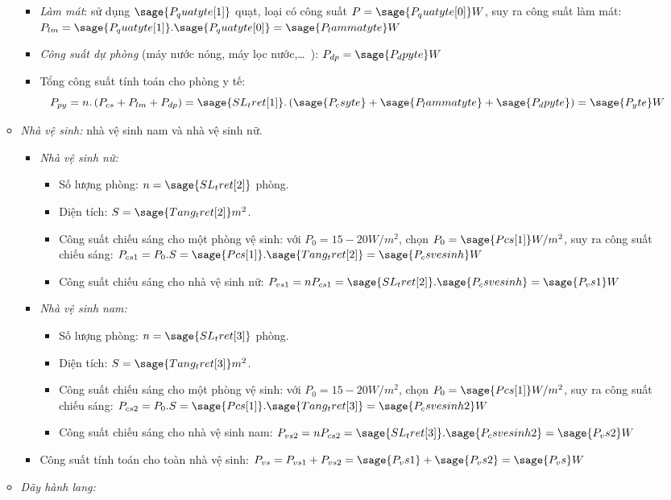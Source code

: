 \begin{enumerate}[a.]
\begin{itemize}
\begin{itemize}
\item \textit{Làm mát}: sử dụng $\sage{P_quatyte[1]}$ quạt, loại có công suất $P = \sage{P_quatyte[0]}W$, suy ra công suất làm mát: $P_{lm} = \sage{P_quatyte[1]}.\sage{P_quatyte[0]}=\sage{P_lammatyte}W$
\item \textit{Công suất dự phòng} (máy nước nóng, máy lọc nước,\ldots~): $P_{dp}=\sage{P_dpyte}W$
\item Tổng công suất tính toán cho phòng y tế:$$P_{py}=n.\left({P_{cs} + P_{lm} + P_{dp}}\right) = \sage{SL_tret[1]}.\left({\sage{P_csyte}+\sage{P_lammatyte} + \sage{P_dpyte}}\right)=\sage{P_yte}W$$
\end{itemize}
\item \textit{Nhà vệ sinh:} nhà vệ sinh nam và nhà vệ sinh nữ.
\begin{itemize}
\item \textit{Nhà vệ sinh nữ:}
\begin{itemize}
\item Số lượng phòng: $n = \sage{SL_tret[2]}$ phòng.
\item Diện tích: $S = \sage{Tang_tret[2]}m^2$.
\item Công suất chiếu sáng cho một phòng vệ sinh: với $P_0 = 15 - 20W/m^2$, chọn $P_0 = \sage{Pcs[1]}W/m^2$, suy ra công suất chiếu sáng: $P_{cs1}=P_0.S = \sage{Pcs[1]}.\sage{Tang_tret[2]}=\sage{P_csvesinh}W$
\item Công suất chiếu sáng cho nhà vệ sinh nữ: $P_{vs1}=nP_{cs1}=\sage{SL_tret[2]}.\sage{P_csvesinh}=\sage{P_vs1}W$
\end{itemize}
\item \textit{Nhà vệ sinh nam:}
\begin{itemize}
\item Số lượng phòng: $n = \sage{SL_tret[3]}$ phòng.
\item Diện tích: $S = \sage{Tang_tret[3]}m^2$.
\item Công suất chiếu sáng cho một phòng vệ sinh: với $P_0 = 15 - 20W/m^2$, chọn $P_0 = \sage{Pcs[1]}W/m^2$, suy ra công suất chiếu sáng: $P_{cs2}=P_0.S = \sage{Pcs[1]}.\sage{Tang_tret[3]}=\sage{P_csvesinh2}W$
\item Công suất chiếu sáng cho nhà vệ sinh nam: $P_{vs2}=nP_{cs2}=\sage{SL_tret[3]}.\sage{P_csvesinh2}=\sage{P_vs2}W$
\end{itemize}
\item Công suất tính toán cho toàn nhà vệ sinh: $P_{vs} = P_{vs1} + P_{vs2} = \sage{P_vs1} + \sage{P_vs2} = \sage{P_vs}W$
\end{itemize}
\item \textit{Dãy hành lang:}

\end{itemize}
\end{enumerate}
